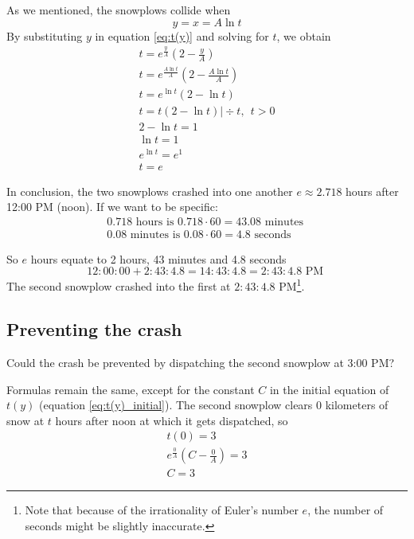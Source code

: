 \documentclass[a4paper,12pt]{article}
\renewcommand*{\textnormal}[1]{\text{ #1 }}
\begin{document}
        \hfill \break
        As we mentioned, the snowplows collide when
        \begin{equation*}
            y = x = A \ln t
        \end{equation*}
        By substituting $y$ in equation \eqref{eq:t(y)} and solving for \(t\), we obtain
        \begin{gather*}
            t = e^\frac{y}{A}\left(2-\frac{y}{A}\right) \\
            t = e^\frac{A \ln t}{A}\left(2-\frac{A \ln t}{A}\right) \\
            t = e^{\ln t}\left(2 - \ln t\right) \\
            t = t (2-\ln t) \Bigg | \div t, \ \ t > 0 \\ 
            2-\ln t = 1 \\
            \ln t = 1 \\
            e^{\ln t} = e^1 \\
            \boxed{t = e}
        \end{gather*}

        In conclusion, the two snowplows crashed into one another \(e \approx 2.718\) hours after 12:00 PM (noon). If we want to be specific:
        \begin{gather*}
            0.718 \textnormal{hours is} 0.718 \cdot 60 = 43.08 \textnormal{minutes} \\
            0.08 \textnormal{minutes is} 0.08 \cdot 60 = 4.8 \textnormal{seconds}
        \end{gather*}

        So \(e\) hours equate to 2 hours, 43 minutes and 4.8 seconds
        \[
            12{:}00{:}00 + 2{:}43{:}4.8 = 14{:}43{:}4.8 = 2{:}43{:}4.8 \textnormal{PM}
        \]
        The second snowplow crashed into the first at \(2{:}43{:}4.8 \text{ PM}\)\footnote{Note that because of the irrationality of Euler's number \(e\), the number of seconds might be slightly inaccurate.}.
        
    \subsection{Preventing the crash}
        Could the crash be prevented by dispatching the second snowplow at 3:00 PM?

        \hfill \break
        Formulas remain the same, except for the constant \(C\) in the initial equation of \(t(y)\) (equation \eqref{eq:t(y)_initial}).
        The second snowplow clears \(0\) kilometers of snow at  $t$ hours after noon at which it gets dispatched, so
        \begin{gather*}
            t(0) = 3 \\
            e^{\frac{0}{A}}\left(C - \frac{0}{A}\right) = 3 \\
            C = 3
        \end{gather*}
\end{document}
